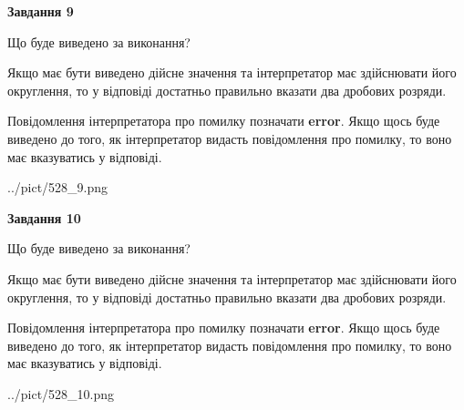 \documentclass[12pt, ukrainian]{article}
\begin{document}
{\begin {Large}
{\begin {center}\textbf{Завдання 9}\end {center}}\par
Що буде виведено за виконання? \par

Якщо має бути виведено дійсне значення та інтерпретатор має здійснювати його округлення, 
то у відповіді достатньо правильно вказати два дробових розряди.

Повідомлення інтерпретатора про помилку позначати \textbf{error}.
Якщо щось буде виведено до того, як інтерпретатор видасть повідомлення про помилку, 
то воно має вказуватись у відповіді. \par

\begin{center}
	{../pict/528_9.png}
\end{center}
\newpage

{\begin {center}\textbf{Завдання 10}\end {center}}\par
Що буде виведено за виконання? \par

Якщо має бути виведено дійсне значення та інтерпретатор має здійснювати його округлення, 
то у відповіді достатньо правильно вказати два дробових розряди.

Повідомлення інтерпретатора про помилку позначати \textbf{error}.
Якщо щось буде виведено до того, як інтерпретатор видасть повідомлення про помилку, 
то воно має вказуватись у відповіді. \par

\begin{center}
	{../pict/528_10.png}
\end{center}
\newpage

\end {Large}}
\end{document}
